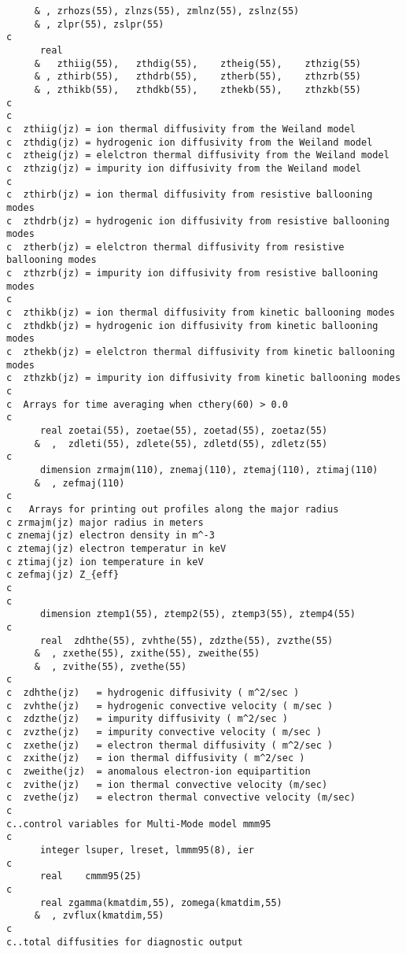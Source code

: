 \begin{verbatim}
     & , zrhozs(55), zlnzs(55), zmlnz(55), zslnz(55)
     & , zlpr(55), zslpr(55)
c
      real
     &   zthiig(55),   zthdig(55),    ztheig(55),    zthzig(55)
     & , zthirb(55),   zthdrb(55),    ztherb(55),    zthzrb(55)
     & , zthikb(55),   zthdkb(55),    zthekb(55),    zthzkb(55)
c
c
c  zthiig(jz) = ion thermal diffusivity from the Weiland model
c  zthdig(jz) = hydrogenic ion diffusivity from the Weiland model
c  ztheig(jz) = elelctron thermal diffusivity from the Weiland model
c  zthzig(jz) = impurity ion diffusivity from the Weiland model
c	    
c  zthirb(jz) = ion thermal diffusivity from resistive ballooning modes
c  zthdrb(jz) = hydrogenic ion diffusivity from resistive ballooning modes
c  ztherb(jz) = elelctron thermal diffusivity from resistive ballooning modes
c  zthzrb(jz) = impurity ion diffusivity from resistive ballooning modes
c	    
c  zthikb(jz) = ion thermal diffusivity from kinetic ballooning modes
c  zthdkb(jz) = hydrogenic ion diffusivity from kinetic ballooning modes
c  zthekb(jz) = elelctron thermal diffusivity from kinetic ballooning modes
c  zthzkb(jz) = impurity ion diffusivity from kinetic ballooning modes
c
c  Arrays for time averaging when cthery(60) > 0.0
c
      real zoetai(55), zoetae(55), zoetad(55), zoetaz(55)
     &  ,  zdleti(55), zdlete(55), zdletd(55), zdletz(55)
c
      dimension zrmajm(110), znemaj(110), ztemaj(110), ztimaj(110)
     &  , zefmaj(110)
c
c   Arrays for printing out profiles along the major radius
c zrmajm(jz) major radius in meters
c znemaj(jz) electron density in m^-3
c ztemaj(jz) electron temperatur in keV
c ztimaj(jz) ion temperature in keV
c zefmaj(jz) Z_{eff}
c
c
      dimension ztemp1(55), ztemp2(55), ztemp3(55), ztemp4(55)
c
      real  zdhthe(55), zvhthe(55), zdzthe(55), zvzthe(55)
     &  , zxethe(55), zxithe(55), zweithe(55)
     &  , zvithe(55), zvethe(55)
c
c  zdhthe(jz)   = hydrogenic diffusivity ( m^2/sec )
c  zvhthe(jz)   = hydrogenic convective velocity ( m/sec )
c  zdzthe(jz)   = impurity diffusivity ( m^2/sec )
c  zvzthe(jz)   = impurity convective velocity ( m/sec )
c  zxethe(jz)   = electron thermal diffusivity ( m^2/sec )
c  zxithe(jz)   = ion thermal diffusivity ( m^2/sec )
c  zweithe(jz)  = anomalous electron-ion equipartition
c  zvithe(jz)   = ion thermal convective velocity (m/sec)
c  zvethe(jz)   = electron thermal convective velocity (m/sec)
c
c..control variables for Multi-Mode model mmm95
c
      integer lsuper, lreset, lmmm95(8), ier
c
      real    cmmm95(25)
c
      real zgamma(kmatdim,55), zomega(kmatdim,55)
     &  , zvflux(kmatdim,55)
c
c..total diffusities for diagnostic output

\end{verbatim}
